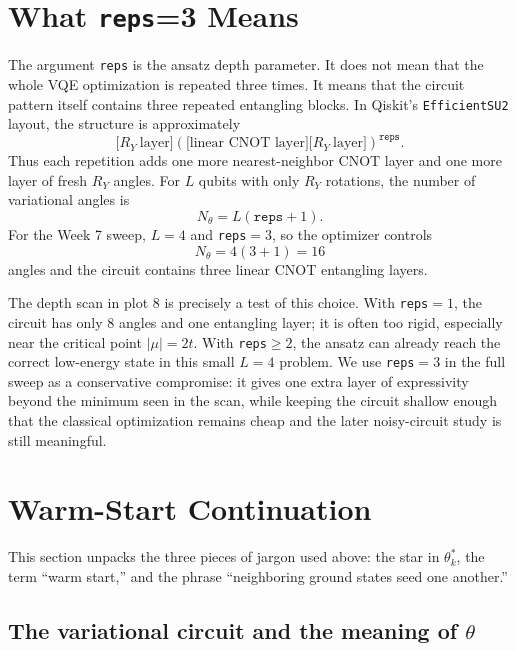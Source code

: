 \documentclass[11pt]{article}
\begin{document}
\section{What \texttt{reps}=3 Means}

The argument \texttt{reps} is the ansatz depth parameter. It does not mean that the whole VQE optimization is repeated three times. It means that the circuit pattern itself contains three repeated entangling blocks. In Qiskit's \texttt{EfficientSU2} layout, the structure is approximately
\begin{equation}
  \bigl[ R_Y\ \text{layer} \bigr]
  \left(\bigl[\text{linear CNOT layer}\bigr]\bigl[R_Y\ \text{layer}\bigr]\right)^{\texttt{reps}} .
\end{equation}
Thus each repetition adds one more nearest-neighbor CNOT layer and one more layer of fresh $R_Y$ angles. For $L$ qubits with only $R_Y$ rotations, the number of variational angles is
\begin{equation}
  N_\theta = L(\texttt{reps}+1).
\end{equation}
For the Week 7 sweep, $L=4$ and \texttt{reps}$=3$, so the optimizer controls
\begin{equation}
  N_\theta = 4(3+1)=16
\end{equation}
angles and the circuit contains three linear CNOT entangling layers.

The depth scan in plot 8 is precisely a test of this choice. With \texttt{reps}$=1$, the circuit has only $8$ angles and one entangling layer; it is often too rigid, especially near the critical point $|\mu|=2t$. With \texttt{reps}$\ge 2$, the ansatz can already reach the correct low-energy state in this small $L=4$ problem. We use \texttt{reps}$=3$ in the full sweep as a conservative compromise: it gives one extra layer of expressivity beyond the minimum seen in the scan, while keeping the circuit shallow enough that the classical optimization remains cheap and the later noisy-circuit study is still meaningful.

\section{Warm-Start Continuation}

This section unpacks the three pieces of jargon used above: the star in $\theta_k^{*}$, the term ``warm start,'' and the phrase ``neighboring ground states seed one another.''

\subsection*{The variational circuit and the meaning of $\theta$}
\end{document}
